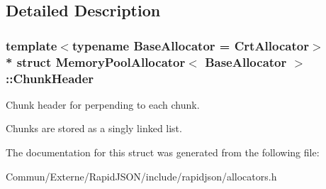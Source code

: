\subsection{Detailed Description}
\subsubsection*{template$<$typename Base\+Allocator = Crt\+Allocator$>$\\*
struct Memory\+Pool\+Allocator$<$ Base\+Allocator $>$\+::\+Chunk\+Header}

Chunk header for perpending to each chunk. 

Chunks are stored as a singly linked list. 

The documentation for this struct was generated from the following file\+:\begin{DoxyCompactItemize}
\item 
Commun/\+Externe/\+Rapid\+J\+S\+O\+N/include/rapidjson/allocators.\+h\end{DoxyCompactItemize}
